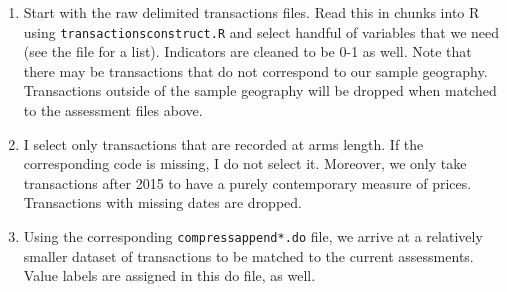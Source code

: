 \documentclass[]{article}
\begin{document}
\begin{enumerate}
	\item Start with the raw delimited transactions files. Read this in chunks into R using \texttt{transactions\textunderscore construct.R} and select handful of variables that we need (see the file for a list). Indicators are cleaned to be 0-1 as well. Note that there may be transactions that do not correspond to our sample geography. Transactions outside of the sample geography will be dropped when matched to the assessment files above. 
	
	\item I select only transactions that are recorded at arms length. If the corresponding code is missing, I do not select it.  Moreover, we only take transactions after 2015 to have a purely contemporary measure of prices. Transactions with missing dates are dropped. 
	
	\item Using the corresponding \texttt{compress\textunderscore append*.do} file, we arrive at a relatively smaller dataset of transactions to be matched to the current assessments. Value labels are assigned in this do file, as well. 
\end{enumerate}
\end{document}
